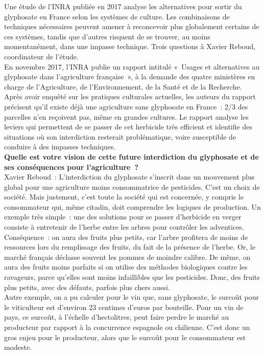 \documentclass[8pt]{article}
\begin{document}
Une étude de l’INRA publiée en 2017 analyse les alternatives pour sortir du glyphosate en France selon les systèmes de culture. Les combinaisons de techniques nécessaires peuvent amener à reconcevoir plus globalement certains de ces systèmes, tandis que d’autres risquent de se trouver, au moins momentanément, dans une impasse technique. Trois questions à Xavier Reboud, coordinateur de l’étude.\\

En novembre 2017, l’INRA publie un rapport intitulé «~Usages et alternatives au glyphosate dans l’agriculture française~», à la demande des quatre ministères en charge de l’Agriculture, de l’Environnement, de la Santé et de la Recherche. Après avoir enquêté sur les pratiques culturales actuelles, les auteurs du rapport précisent qu’il existe déjà une agriculture sans glyphosate en France~: 2/3 des parcelles n’en reçoivent pas, même en grandes cultures. Le rapport analyse les leviers qui permettent de se passer de cet herbicide très efficient et identifie des situations où son interdiction resterait problématique, voire susceptible de conduire à des impasses techniques.\\

\textbf{Quelle est votre vision de cette future interdiction du glyphosate et de ses conséquences pour l’agriculture~?}\\

Xavier Reboud~: L’interdiction du glyphosate s’inscrit dans un mouvement plus global pour une agriculture moins consommatrice de pesticides. C’est un choix de société. Mais justement, c’est toute la société qui est concernée, y compris le consommateur qui, même citadin, doit comprendre les logiques de production. Un exemple très simple~: une des solutions pour se passer d’herbicide en verger consiste à entretenir de l’herbe entre les arbres pour contrôler les adventices. Conséquence~: on aura des fruits plus petits, car l’arbre profitera de moins de ressources lors du remplissage des fruits, du fait de la présence de l’herbe. Or, le marché français déclasse souvent les pommes de moindre calibre. De même, on aura des fruits moins parfaits si on utilise des méthodes biologiques contre les ravageurs, parce qu’elles sont moins infaillibles que les pesticides. Donc, des fruits plus petits, avec des défauts, parfois plus chers aussi.\\

Autre exemple, on a pu calculer pour le vin que, sans glyphosate, le surcoût pour le viticulteur est d’environ 23 centimes d’euros par bouteille. Pour un vin de pays, ce surcoût, à l’échelle d’hectolitres, peut faire perdre le marché au producteur par rapport à la concurrence espagnole ou chilienne. C’est donc un gros enjeu pour le producteur, alors que le surcoût pour le consommateur est modeste.\\
\end{document}
